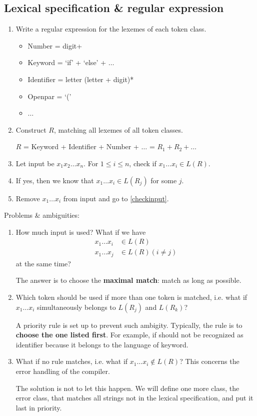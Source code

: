 \subsection{Lexical specification \& regular expression}
\begin{enumerate}
\item Write a regular expression for the lexemes of each token class.
\begin{itemize}
\item Number = digit+
\item Keyword = `if' + `else' + $\dots$
\item Identifier = letter (letter + digit)*
\item Openpar = `('
\item $\dots$
\end{itemize}
\item Construct $R$, matching all lexemes of all token classes.

$R$ = Keyword + Identifier + Number + $\dots$ = $R_1 + R_2 + \dots$
\item Let input be $x_1x_2\dots x_n$. For $1\le i\le n$, check if $x_1\dots x_i\in L(R)$.\label{checkinput}
\item If yes, then we know that $x_1\dots x_i\in L(R_j)$ for some $j$.
\item Remove $x_1\dots x_i$ from input and go to \ref{checkinput}.
\end{enumerate}
Problems \& ambiguities:
\begin{enumerate}
\item How much input is used? What if we have 
\begin{equation*}
\begin{split}
x_1\dots x_i&\in L(R)\\
x_1\dots x_j&\in L(R)(i\ne j)
\end{split}
\end{equation*}
at the same time? 

The answer is to choose the {\bf maximal match}: match as long as possible.
\item Which token should be used if more than one token is matched, i.e. what if $x_1\dots x_i$ simultaneously belongs to $L(R_j)$ and $L(R_k)$? 

A priority rule is set up to prevent such ambigity. Typically, the rule is to {\bf choose the one listed first}. For example, {\sf if} should not be recognized as identifier because it belongs to the language of keyword.
\item What if no rule matches, i.e. what if $x_1\dots x_i\notin L(R)$? This concerns the error handling of the compiler.

The solution is not to let this happen. We will define one more class, the error class, that matches all strings not in the lexical specification, and put it last in priority.
\end{enumerate}
